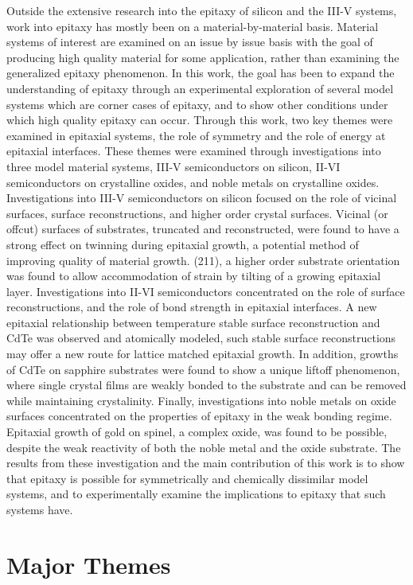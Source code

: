 Outside the extensive research into the epitaxy of silicon and the III-V systems, work into epitaxy has mostly been on a material-by-material basis.
Material systems of interest are examined on an issue by issue basis with the goal of producing high quality material for some application, rather than examining the generalized epitaxy phenomenon.
In this work, the goal has been to expand the understanding of epitaxy through an experimental exploration of several model systems which are corner cases of epitaxy, and to show other conditions under which high quality epitaxy can occur.
Through this work, two key themes were examined in epitaxial systems, the role of symmetry and the role of energy at epitaxial interfaces.
These themes were examined through investigations into three model material systems, III-V semiconductors on silicon, II-VI semiconductors on crystalline oxides, and noble metals on crystalline oxides.
Investigations into III-V semiconductors on silicon focused on the role of vicinal surfaces, surface reconstructions, and higher order crystal surfaces.
Vicinal (or offcut) surfaces of substrates, truncated and reconstructed, were found to have a strong effect on twinning during epitaxial growth, a potential method of improving quality of material growth.
(211), a higher order substrate orientation was found to allow accommodation of strain by tilting of a growing epitaxial layer.
Investigations into II-VI semiconductors concentrated on the role of surface reconstructions, and the role of bond strength in epitaxial interfaces.
A new epitaxial relationship between temperature stable surface reconstruction and CdTe was observed and atomically modeled, such stable surface reconstructions may offer a new route for lattice matched epitaxial growth.
In addition, growths of CdTe on sapphire substrates were found to show a unique liftoff phenomenon, where single crystal films are weakly bonded to the substrate and can be removed while maintaining crystalinity.
Finally, investigations into noble metals on oxide surfaces concentrated on the properties of epitaxy in the weak bonding regime.
Epitaxial growth of gold on spinel, a complex oxide, was found to be possible, despite the weak reactivity of both the noble metal and the oxide substrate.
The results from these investigation and the main contribution of this work is to show that epitaxy is possible for symmetrically and chemically dissimilar model systems, and to experimentally examine the implications to epitaxy that such systems have.

\section{Major Themes}
